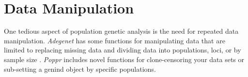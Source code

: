 \documentclass[letterpaper]{article}\usepackage[]{graphicx}\usepackage[]{color}
\newcommand{\tab}{\hspace*{1em}}
\begin{document}
% 
%
%
%
\section{Data Manipulation}\label{data.manip}

\tab\tab One tedious aspect of population genetic analysis is the need for repeated data manipulation. \textit{Adegenet} has some functions for manipulating data that are limited to replacing missing data and dividing data into populations, loci, or by sample size \cite{Jombart:2008}. \textit{Poppr} includes novel functions for clone-censoring your data sets or sub-setting a genind object by specific populations.
\end{document}
